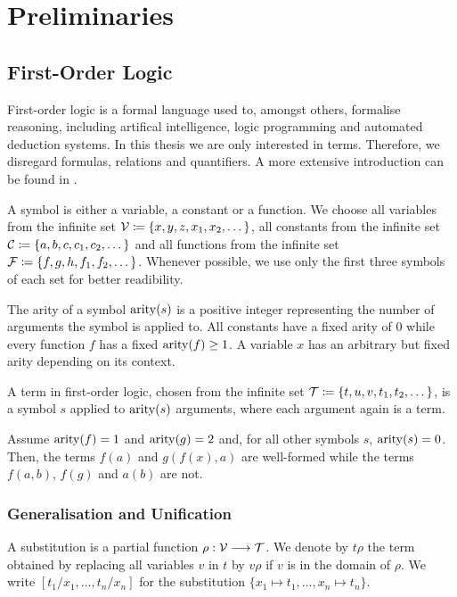 \chapter{Preliminaries} \label{prelim}
\section{First-Order Logic}
First-order logic is a formal language used to, amongst others, formalise reasoning, including artifical intelligence, logic programming and automated deduction systems. In this thesis we are only interested in terms. Therefore, we disregard formulas, relations and quantifiers. A more extensive introduction can be found in \cite{abiteboul_foundations_1995}.

A symbol is either a variable, a constant or a function. We choose all variables from the infinite set $\mathcal{V} \coloneqq \{x, y, z, x_{1}, x_{2}, \dots\}$, all constants from the infinite set $\mathcal{C} \coloneqq \{a, b, c, c_{1}, c_{2}, \dots\}$ and all functions from the infinite set $\mathcal{F} \coloneqq \{f, g, h, f_{1}, f_{2}, \dots\}$. Whenever possible, we use only the first three symbols of each set for better readibility.

The arity of a symbol $\mathrm{arity}(s)$ is a positive integer representing the number of arguments the symbol is applied to. All constants have a fixed arity of $0$ while every function $f$ has a fixed $\mathrm{arity}(f) \geq 1$. A variable $x$ has an arbitrary but fixed arity depending on its context.

A term in first-order logic, chosen from the infinite set $\mathcal{T} \coloneqq \{t, u, v, t_{1}, t_{2}, \dots\}$, is a symbol $s$ applied to $\mathrm{arity}(s)$ arguments, where each argument again is a term.

\begin{exmpl}
Assume $\mathrm{arity}(f) = 1$ and $\mathrm{arity}(g) = 2$ and, for all other symbols $s$, $\mathrm{arity}(s) = 0$. Then, the terms $f(a)$ and $g(f(x), a)$ are well-formed while the terms $f(a,b)$, $f(g)$ and $a(b)$ are not.
\end{exmpl}

\subsection{Generalisation and Unification}
\begin{defn}
  A substitution is a partial function $\rho : \mathcal{V} \longrightarrow \mathcal{T}$. We denote by $t \rho$ the term obtained by replacing all variables $v$ in $t$ by $v \rho$ if $v$ is in the domain of $\rho$. We write $[t_{1}/x_{1},\dots,t_{n}/x_{n}]$ for the substitution $\{x_{1} \mapsto t_{1}, \dots, x_{n} \mapsto t_{n}\}$.
\end{defn}

